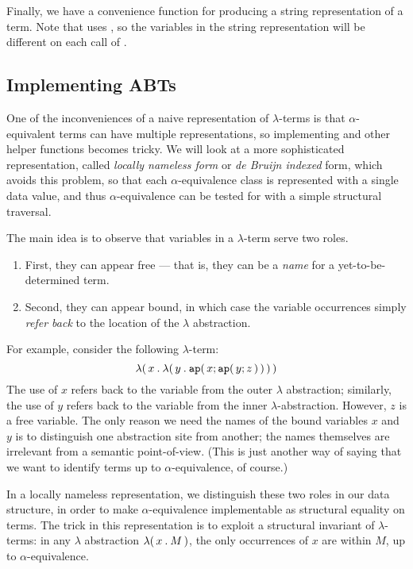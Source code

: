 \documentclass[11pt]{article}
\begin{document}
Finally, we have a convenience function  for producing a string representation of a term.
Note that  uses , so the variables in the string representation will be different on each call of .

\subsection{Implementing ABTs}

One of the inconveniences of a naive representation of $\lambda$-terms is that $\alpha$-equivalent terms can have multiple representations, so implementing  and other helper functions becomes tricky.
We will look at a more sophisticated representation, called \emph{locally nameless form} or \emph{de Bruijn indexed} form, which avoids this problem, so that each $\alpha$-equivalence class is represented with a single data value, and thus $\alpha$-equivalence can be tested for with a simple structural traversal.

The main idea is to observe that variables in a $\lambda$-term serve two roles.
\begin{enumerate}
  \item
    First, they can appear free --- that is, they can be a \emph{name} for a yet-to-be-determined term.
  \item
    Second, they can appear bound, in which case the variable occurrences simply \emph{refer back} to the location of the $\lambda$ abstraction.
\end{enumerate}

For example, consider the following $\lambda$-term:
\[ {\lambda}\mathtt{(}\,{x}\mathbin{\mathtt{.}}{{\lambda}\mathtt{(}\,{y}\mathbin{\mathtt{.}}{{\mathtt{ap}}\mathtt{(}\,x;{\mathtt{ap}}\mathtt{(}\,y;z\,\mathtt{)}\,\mathtt{)}}\,\mathtt{)}}\,\mathtt{)} \]
The use of $x$ refers back to the variable from the outer $\lambda$ abstraction; similarly, the use of $y$ refers back to the variable from the inner $\lambda$-abstraction.
However, $z$ is a free variable.
The only reason we need the names of the bound variables $x$ and $y$ is to distinguish one abstraction site from another; the names themselves are
irrelevant from a semantic point-of-view.
(This is just another way of saying that we want to identify terms up to $\alpha$-equivalence, of course.)

In a locally nameless representation, we distinguish these two roles in our data structure, in order to make $\alpha$-equivalence implementable as structural equality on terms.
The trick in this representation is to exploit a structural invariant of $\lambda$-terms: in any $\lambda$ abstraction ${\lambda}\mathtt{(}\,{x}\mathbin{\mathtt{.}}{M}\,\mathtt{)}$, the only occurrences of $x$ are within $M$, up to $\alpha$-equivalence.
\end{document}

